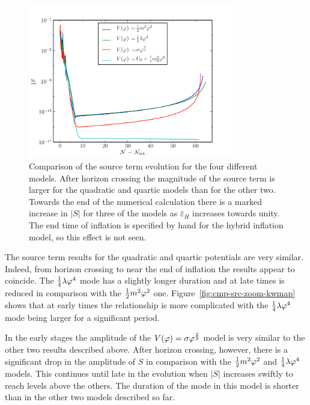\begin{figure}[htbp]
 \centering
 \includegraphics[width=0.8\textwidth]{numerical/graphs/cmp_src_kwmap-large}
 \caption[Comparison of source term for models]{Comparison of the source term
evolution for the four different models. After horizon crossing the magnitude of the
source term is larger for the quadratic and quartic models than for the other two.
Towards the end of the numerical calculation there is a marked increase in $|S|$ for
three of the models as $\bar{\varepsilon}_H$ increases towards unity. The end time of
inflation is specified by hand for the hybrid inflation model, so this effect is
not seen.}
\label{fig:cmp-src-kwmap}
\end{figure}
% 

The source term results for the quadratic and quartic potentials are very similar.
Indeed, from horizon crossing to near the end of inflation the results appear to
coincide.
The $\frac{1}{4}\lambda\varphi^4$ mode has a slightly longer duration and at late times is reduced in comparison
with the $\frac{1}{2} m^2 \varphi^2$ one. Figure~\ref{fig:cmp-src-zoom-kwmap} shows that at early times the
relationship is more complicated with the $\frac{1}{4}\lambda\varphi^4$ mode being larger for a significant
period.

In the early stages the amplitude of the $V(\varphi)=\sigma\varphi^{\frac{2}{3}}$ model is very
similar to the other two
results described above. After horizon crossing, however, there is a significant drop
in the
amplitude of $S$ in comparison with the $\frac{1}{2} m^2 \varphi^2$ and $\frac{1}{4}\lambda\varphi^4$ models. This
continues
until late in the evolution when $|S|$ increases swiftly to reach levels above the
others.
The duration of the mode in this model is shorter than in the other two models
described so far. 

